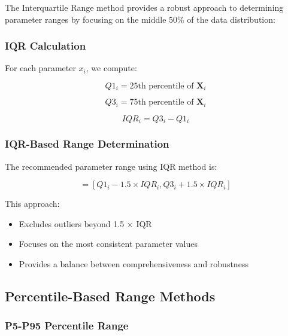 \documentclass[../main.tex]{subfiles}
\begin{document}
The Interquartile Range method provides a robust approach to determining parameter ranges by focusing on the middle 50\% of the data distribution:

\subsubsection{IQR Calculation}

For each parameter $x_i$, we compute:

\begin{equation}
Q1_i = \text{25th percentile of } \mathbf{X}_i
\label{eq:q1}
\end{equation}

\begin{equation}
Q3_i = \text{75th percentile of } \mathbf{X}_i
\label{eq:q3}
\end{equation}

\begin{equation}
IQR_i = Q3_i - Q1_i
\label{eq:iqr}
\end{equation}

\subsubsection{IQR-Based Range Determination}

The recommended parameter range using IQR method is:

\begin{equation}
[x_i^{min}, x_i^{max}] = [Q1_i - 1.5 \times IQR_i, Q3_i + 1.5 \times IQR_i]
\label{eq:iqr_range}
\end{equation}

This approach:
\begin{itemize}
    \item Excludes outliers beyond 1.5 × IQR
    \item Focuses on the most consistent parameter values
    \item Provides a balance between comprehensiveness and robustness
\end{itemize}

\subsection{Percentile-Based Range Methods}

\subsubsection{P5-P95 Percentile Range}
\end{document}
